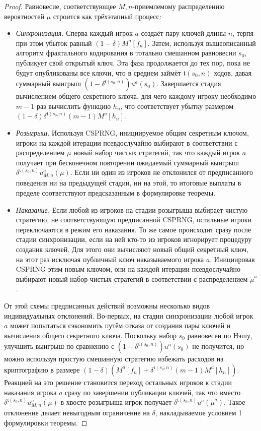 \begin{proof}
	Равновесие, соответствующее $M,n$-приемлемому распределению вероятностей $\mu$ строится как трёхэтапный процесс:
	\begin{itemize}
		\item \emph{Синхронизация.} Сперва каждый игрок $a$ создаёт пару ключей длины $n$, терпя при этом убыток равный $(1 - \delta) M^a[f_n]$. Затем, используя вышеописанный алгоритм фрактального кодирования в тотально смешанном равновесии $s_0$, публикует свой открытый ключ. Эта фаза продолжается до тех пор, пока не будут опубликованы все ключи, что в среднем займёт $\mathfrak{t}(s_0, n)$ ходов, давая суммарный выигрыш $(1 - \delta^{\mathfrak{t}(s_0, n)}) u^a(s_0)$. Завершается стадия вычислением общего секретного ключа, для чего каждому игроку необходимо $m - 1$ раз вычислить функцию $h_n$, что соответствует убытку размером $(1 - \delta) \delta^{\mathfrak{t}(s_0, n)} (m - 1) M^a[h_n]$.
		\item \emph{Розыгрыш.} Используя CSPRNG, инициируемое общим секретным ключом, игроки на каждой итерации псевдослучайно выбирают в соответствии с распределением $\mu$ новый набор чистых стратегий, так что каждый игрок $a$ получает при бесконечном повторении ожидаемый суммарный выигрыш $\delta^{\mathfrak{t}(s_0, n)} u_{M,n}^a(\mu)$. Если ни один из игроков не отклонился от предписанного поведения ни на предыдущей стадии, ни на этой, то итоговые выплаты в пределе соответствуют предсказанным в формулировке теоремы.
		\item \emph{Наказание.} Если любой из игроков на стадии розыгрыша выбирает чистую стратегию, не соответствующую предписанной CSPRNG, остальные игроки переключаются в режим его наказания. То же самое происходит сразу после стадии синхронизации, если на ней кто-то из игроков игнорирует процедуру создания ключей. Для этого они вычисляют новый общий секретный ключ, на этот раз исключая публичный ключ наказываемого игрока $a$. Инициировав CSPRNG этим новым ключом, они на каждой итерации псевдослучайно выбирают новый набор чистых стратегий в соответствии с распределением $\check{\mu}^{a}$. %
	\end{itemize}

	От этой схемы предписанных действий возможны несколько видов индивидуальных отклонений. Во-первых, на стадии синхронизации любой игрок $a$ может попытаться сэкономить путём отказа от создания пары ключей и вычисления общего секретного ключа. Поскольку набор $s_0$ равновесен по Нэшу, улучшить выигрыш по сравнению с $(1 - \delta^{\mathfrak{t}(s_0, n)}) u^a(s_0)$ не получится, но можно используя простую смешанную стратегию избежать расходов на криптографию в размере $(1 - \delta) (M^a[f_n] + \delta^{\mathfrak{t}(s_0, n)} (m - 1) M^a[h_n])$. Реакцией на это решение становится переход остальных игроков к стадии наказания игрока $a$ сразу по завершении публикации ключей, так что вместо $\delta^{\mathfrak{t}(s_0, n)} u_{M,n}^a(\mu)$ в хвосте розыгрыша игрок получает $\delta^{\mathfrak{t}(s_0, n)} u^a(\check{\mu}^a)$. Такое отклонение делает невыгодным ограничение на $\delta$, накладываемое условием 1 формулировки теоремы.
	

\end{proof}
